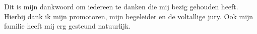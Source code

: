 \begin{preface}

  Dit is mijn dankwoord om iedereen te danken die mij bezig gehouden heeft.
  Hierbij dank ik mijn promotoren, mijn begeleider en de voltallige jury. Ook
  mijn familie heeft mij erg gesteund natuurlijk.

\end{preface}

